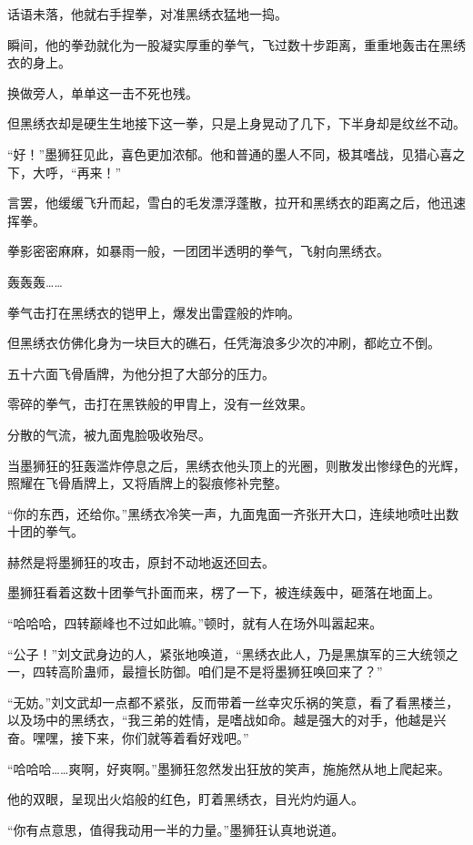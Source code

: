 \begin{this_body}
话语未落，他就右手捏拳，对准黑绣衣猛地一捣。

瞬间，他的拳劲就化为一股凝实厚重的拳气，飞过数十步距离，重重地轰击在黑绣衣的身上。

换做旁人，单单这一击不死也残。

但黑绣衣却是硬生生地接下这一拳，只是上身晃动了几下，下半身却是纹丝不动。

“好！”墨狮狂见此，喜色更加浓郁。他和普通的墨人不同，极其嗜战，见猎心喜之下，大呼，“再来！”

言罢，他缓缓飞升而起，雪白的毛发漂浮蓬散，拉开和黑绣衣的距离之后，他迅速挥拳。

拳影密密麻麻，如暴雨一般，一团团半透明的拳气，飞射向黑绣衣。

轰轰轰……

拳气击打在黑绣衣的铠甲上，爆发出雷霆般的炸响。

但黑绣衣仿佛化身为一块巨大的礁石，任凭海浪多少次的冲刷，都屹立不倒。

五十六面飞骨盾牌，为他分担了大部分的压力。

零碎的拳气，击打在黑铁般的甲胄上，没有一丝效果。

分散的气流，被九面鬼脸吸收殆尽。

当墨狮狂的狂轰滥炸停息之后，黑绣衣他头顶上的光圈，则散发出惨绿色的光辉，照耀在飞骨盾牌上，又将盾牌上的裂痕修补完整。

“你的东西，还给你。”黑绣衣冷笑一声，九面鬼面一齐张开大口，连续地喷吐出数十团的拳气。

赫然是将墨狮狂的攻击，原封不动地返还回去。

墨狮狂看着这数十团拳气扑面而来，楞了一下，被连续轰中，砸落在地面上。

“哈哈哈，四转巅峰也不过如此嘛。”顿时，就有人在场外叫嚣起来。

“公子！”刘文武身边的人，紧张地唤道，“黑绣衣此人，乃是黑旗军的三大统领之一，四转高阶蛊师，最擅长防御。咱们是不是将墨狮狂唤回来了？”

“无妨。”刘文武却一点都不紧张，反而带着一丝幸灾乐祸的笑意，看了看黑楼兰，以及场中的黑绣衣，“我三弟的姓情，是嗜战如命。越是强大的对手，他越是兴奋。嘿嘿，接下来，你们就等着看好戏吧。”

“哈哈哈……爽啊，好爽啊。”墨狮狂忽然发出狂放的笑声，施施然从地上爬起来。

他的双眼，呈现出火焰般的红色，盯着黑绣衣，目光灼灼逼人。

“你有点意思，值得我动用一半的力量。”墨狮狂认真地说道。


\end{this_body}
